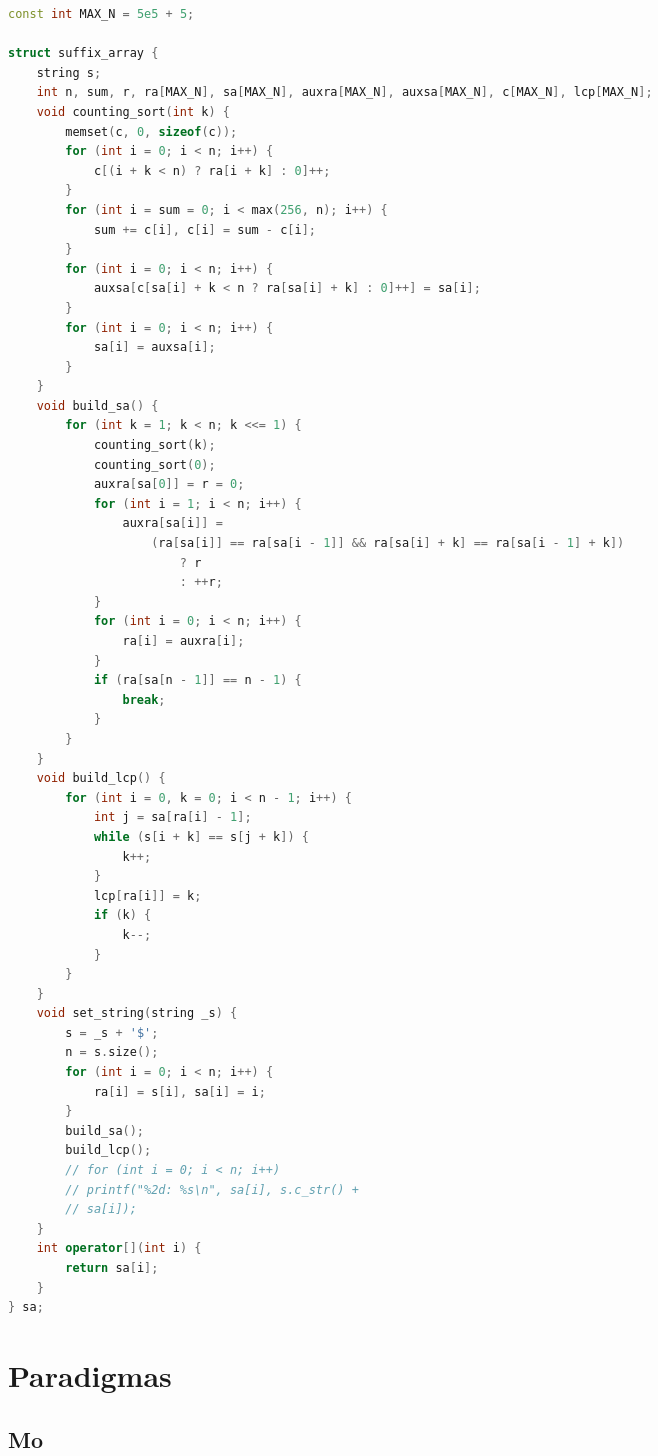 \documentclass[11pt, a4paper, oneside]{book}
\begin{document}
\begin{multicols}{2}
\begin{lstlisting}[language=C++]
const int MAX_N = 5e5 + 5;

struct suffix_array {
    string s;
    int n, sum, r, ra[MAX_N], sa[MAX_N], auxra[MAX_N], auxsa[MAX_N], c[MAX_N], lcp[MAX_N];
    void counting_sort(int k) {
        memset(c, 0, sizeof(c));
        for (int i = 0; i < n; i++) {
            c[(i + k < n) ? ra[i + k] : 0]++;
        }
        for (int i = sum = 0; i < max(256, n); i++) {
            sum += c[i], c[i] = sum - c[i];
        }
        for (int i = 0; i < n; i++) {
            auxsa[c[sa[i] + k < n ? ra[sa[i] + k] : 0]++] = sa[i];
        }
        for (int i = 0; i < n; i++) {
            sa[i] = auxsa[i];
        }
    }
    void build_sa() {
        for (int k = 1; k < n; k <<= 1) {
            counting_sort(k);
            counting_sort(0);
            auxra[sa[0]] = r = 0;
            for (int i = 1; i < n; i++) {
                auxra[sa[i]] =
                    (ra[sa[i]] == ra[sa[i - 1]] && ra[sa[i] + k] == ra[sa[i - 1] + k])
                        ? r
                        : ++r;
            }
            for (int i = 0; i < n; i++) {
                ra[i] = auxra[i];
            }
            if (ra[sa[n - 1]] == n - 1) {
                break;
            }
        }
    }
    void build_lcp() {
        for (int i = 0, k = 0; i < n - 1; i++) {
            int j = sa[ra[i] - 1];
            while (s[i + k] == s[j + k]) {
                k++;
            }
            lcp[ra[i]] = k;
            if (k) {
                k--;
            }
        }
    }
    void set_string(string _s) {
        s = _s + '$';
        n = s.size();
        for (int i = 0; i < n; i++) {
            ra[i] = s[i], sa[i] = i;
        }
        build_sa();
        build_lcp();
        // for (int i = 0; i < n; i++)
        // printf("%2d: %s\n", sa[i], s.c_str() +
        // sa[i]);
    }
    int operator[](int i) {
        return sa[i];
    }
} sa;
\end{lstlisting}
\end{multicols}

\hfill

\newpage

%
%
%
%

\chapter{Paradigmas}

\section{Mo}
\end{document}
